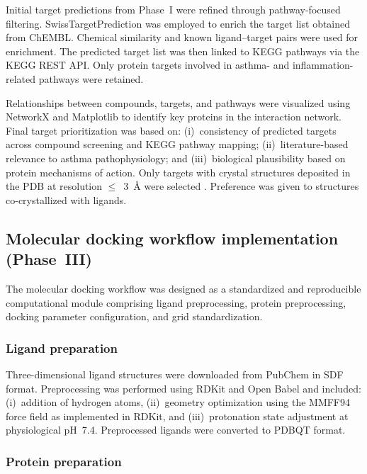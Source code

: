 \documentclass[11pt,a4paper]{article}
\begin{document}
Initial target predictions from Phase~I were refined through pathway-focused filtering. SwissTargetPrediction \cite{daina2019} was employed to enrich the target list obtained from ChEMBL. Chemical similarity and known ligand--target pairs were used for enrichment. The predicted target list was then linked to KEGG pathways via the KEGG REST API. Only protein targets involved in asthma- and inflammation-related pathways were retained.

Relationships between compounds, targets, and pathways were visualized using NetworkX \cite{hagberg2008} and Matplotlib \cite{hunter2007} to identify key proteins in the interaction network. Final target prioritization was based on: (i)~consistency of predicted targets across compound screening and KEGG pathway mapping; (ii)~literature-based relevance to asthma pathophysiology; and (iii)~biological plausibility based on protein mechanisms of action. Only targets with crystal structures deposited in the PDB at resolution $\leq$~3~\AA{} were selected \cite{flachsenberg2023}. Preference was given to structures co-crystallized with ligands.


\subsection{Molecular docking workflow implementation (Phase~III)}

The molecular docking workflow was designed as a standardized and reproducible computational module comprising ligand preprocessing, protein preprocessing, docking parameter configuration, and grid standardization.

\subsubsection{Ligand preparation}

Three-dimensional ligand structures were downloaded from PubChem in SDF format. Preprocessing was performed using RDKit and Open Babel \cite{oboyle2011} and included: (i)~addition of hydrogen atoms, (ii)~geometry optimization using the MMFF94 force field as implemented in RDKit, and (iii)~protonation state adjustment at physiological pH~7.4. Preprocessed ligands were converted to PDBQT format.

\subsubsection{Protein preparation}
\end{document}
